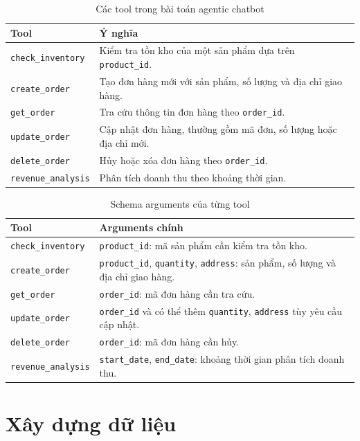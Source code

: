 \documentclass[12pt,a4paper,oneside]{report}
\begin{document}
\begin{table}[H]
\centering
\caption{Các tool trong bài toán agentic chatbot}
\begin{tabularx}{\textwidth}{p{3.4cm}X}
\toprule
\textbf{Tool} & \textbf{Ý nghĩa} \\
\midrule
\texttt{check\_inventory} & Kiểm tra tồn kho của một sản phẩm dựa trên \texttt{product\_id}. \\
\texttt{create\_order} & Tạo đơn hàng mới với sản phẩm, số lượng và địa chỉ giao hàng. \\
\texttt{get\_order} & Tra cứu thông tin đơn hàng theo \texttt{order\_id}. \\
\texttt{update\_order} & Cập nhật đơn hàng, thường gồm mã đơn, số lượng hoặc địa chỉ mới. \\
\texttt{delete\_order} & Hủy hoặc xóa đơn hàng theo \texttt{order\_id}. \\
\texttt{revenue\_analysis} & Phân tích doanh thu theo khoảng thời gian. \\
\bottomrule
\end{tabularx}
\end{table}

\begin{table}[H]
\centering
\caption{Schema arguments của từng tool}
\small
\begin{tabularx}{\textwidth}{p{3.3cm}X}
\toprule
\textbf{Tool} & \textbf{Arguments chính} \\
\midrule
\texttt{check\_inventory} & \texttt{product\_id}: mã sản phẩm cần kiểm tra tồn kho. \\
\texttt{create\_order} & \texttt{product\_id}, \texttt{quantity}, \texttt{address}: sản phẩm, số lượng và địa chỉ giao hàng. \\
\texttt{get\_order} & \texttt{order\_id}: mã đơn hàng cần tra cứu. \\
\texttt{update\_order} & \texttt{order\_id} và có thể thêm \texttt{quantity}, \texttt{address} tùy yêu cầu cập nhật. \\
\texttt{delete\_order} & \texttt{order\_id}: mã đơn hàng cần hủy. \\
\texttt{revenue\_analysis} & \texttt{start\_date}, \texttt{end\_date}: khoảng thời gian phân tích doanh thu. \\
\bottomrule
\end{tabularx}
\end{table}

\section{Xây dựng dữ liệu}
\end{document}

